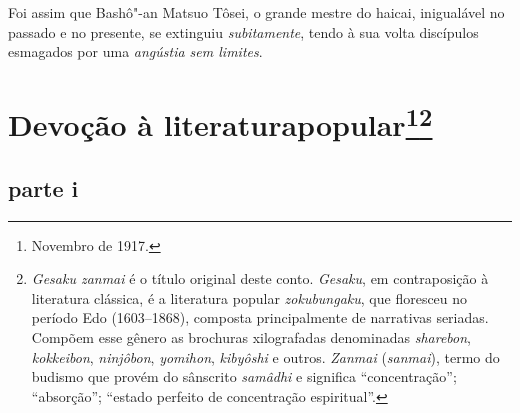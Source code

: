 Foi assim que Bashô"-an Matsuo Tôsei, o grande mestre do haicai,
inigualável no passado e no presente, se extinguiu \textit{subitamente}, 
tendo à sua volta discípulos esmagados por uma \textit{angústia sem limites}.

\chapter[Devoção à literatura popular]{Devoção à literatura\break popular\footnote{Novembro de 1917.}\footnote{\textit{Gesaku zanmai}
é o título original deste conto. \textit{Gesaku}, em contraposição à literatura clássica, é
a literatura popular \textit{zokubungaku}, que floresceu no período Edo
(1603--1868), composta principalmente de narrativas seriadas. Compõem
esse gênero as brochuras xilografadas denominadas \textit{sharebon},
\textit{kokkeibon}, \textit{ninjôbon}, \textit{yomihon},
\textit{kibyôshi} e outros. \textit{Zanmai} (\textit{sanmai}), termo do
budismo que provém do sânscrito \textit{samâdhi} e significa ``concentração'';
``absorção''; ``estado perfeito de concentração espiritual''.}}

\section*{parte i}

